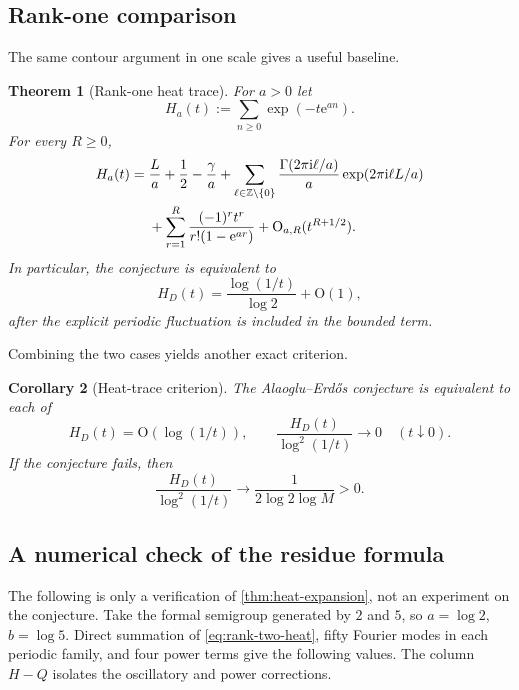 \documentclass[11pt,oneside]{article}
\newtheorem{theorem}{Theorem}[section]
\newtheorem{corollary}[theorem]{Corollary}
\theoremstyle{definition}
\theoremstyle{remark}
\newcommand{\Z}{\mathbb Z}
\newcommand{\e}{\mathrm e}
\newcommand{\ii}{\mathrm i}
\newcommand{\bigO}{\mathrm O}
\begin{document}
\subsection{Rank-one comparison}

The same contour argument in one scale gives a useful baseline.

\begin{theorem}[Rank-one heat trace]
\label{thm:rank-one-heat}
For $a>0$ let
\[
 H_a(t):=\sum_{n\ge0}\exp(-t\e^{an}).
\]
For every $R\ge0$,
\begin{align}
 H_a(t)
  ={}&\frac{L}{a}+\frac12-\frac\gamma a
  +\sum_{\ell\in\Z\setminus\{0\}}
     \frac{\Gamma(2\pi\ii\ell/a)}{a}
     \exp(2\pi\ii\ell L/a)
  \notag\\
  &+\sum_{r=1}^{R}
     \frac{(-1)^rt^r}{r!(1-\e^{ar})}
  +\bigO_{a,R}(t^{R+1/2}).
  \label{eq:rank-one-heat-expansion}
\end{align}
In particular, the conjecture is equivalent to
\[
  H_D(t)=\frac{\log(1/t)}{\log2}+\bigO(1),
\]
after the explicit periodic fluctuation is included in the bounded term.
\end{theorem}

Combining the two cases yields another exact criterion.

\begin{corollary}[Heat-trace criterion]
\label{cor:heat-criterion}
The Alaoglu--Erd\H{o}s conjecture is equivalent to each of
\[
 H_D(t)=\bigO(\log(1/t)),
 \qquad
 \frac{H_D(t)}{\log^2(1/t)}\longrightarrow0
 \quad(t\downarrow0).
\]
If the conjecture fails, then
\[
 \frac{H_D(t)}{\log^2(1/t)}\longrightarrow\frac1{2\log2\log M}>0.
\]
\end{corollary}

\subsection{A numerical check of the residue formula}

The following is only a verification of \cref{thm:heat-expansion}, not an experiment on the conjecture.  Take the formal semigroup generated by $2$ and $5$, so $a=\log2$, $b=\log5$.  Direct summation of \eqref{eq:rank-two-heat}, fifty Fourier modes in each periodic family, and four power terms give the following values.  The column $H-Q$ isolates the oscillatory and power corrections.
\end{document}
